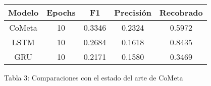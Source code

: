 \begin{figure}[htb]%
\begin{tabular}{c|c|c|c|c}
Modelo & Epochs & F1 & Precisión & Recobrado\\
\hline
CoMeta & 10 & 0.3346 & 0.2324 & 0.5972\\
\hline
LSTM & 10 & 0.2684 & 0.1618 & 0.8435\\
\hline
GRU & 10 & 0.2171 & 0.1580 & 0.3469\\
\hline
\end{tabular}
\caption{Tabla 3: Comparaciones con el estado del arte de CoMeta \label{Tabla:3}}%
\end{figure}